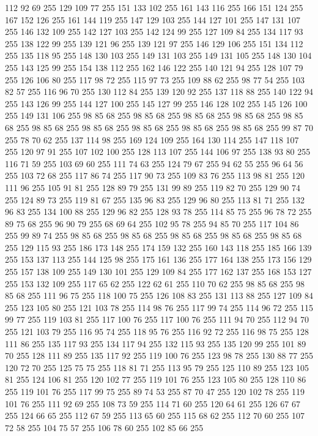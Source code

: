 112 92 69 255 129 109 77 255 151 133 102 255 161 143 116 255 166 151 124 255 167 152 126 255 161 144 119 255 147 129 103 255 144 127 101 255 147 131 107 255 146 132 109 255 142 127 103 255 142 124 99 255 127 109 84 255 134 117 93 255 138 122 99 255 139 121 96 255 139 121 97 255 146 129 106 255 151 134 112 255 135 118 95 255 148 130 103 255 149 131 103 255 149 131 105 255 148 130 104 255 143 125 99 255 154 138 112 255 162 146 122 255 140 121 94 255 128 107 79 255 126 106 80 255 117 98 72 255 115 97 73 255 109 88 62 255 98 77 54 255 103 82 57 255 116 96 70 255 130 112 84 255 139 120 92 255 137 118 88 255 140 122 94 255 143 126 99 255 144 127 100 255 145 127 99 255 146 128 102 255 145 126 100 255 149 131 106 255 98 85 68 255 98 85 68 255 98 85 68 255 98 85 68 255 98 85 68 255 98 85 68 255 98 85 68 255 98 85 68 255 98 85 68 255 98 85 68 255 99 87 70 255 78 70 62 255 137 114 98 255 169 124 109 255 164 130 114 255 147 118 107 255 120 97 91 255
107 102 100 255 128 113 107 255 144 106 97 255 138 93 80 255 116 71 59 255 103 69 60 255 111 74 63 255 124 79 67 255 94 62 55 255 96 64 56 255 103 72 68 255 117 86 74 255 117 90 73 255 109 83 76 255 113 98 81 255 120 111 96 255 105 91 81 255 128 89 79 255 131 99 89 255 119 82 70 255 129 90 74 255 124 89 73 255 119 81 67 255 135 96 83 255 129 96 80 255 113 81 71 255 132 96 83 255 134 100 88 255 129 96 82 255 128 93 78 255 114 85 75 255 96 78 72 255 89 75 68 255 96 90 79 255 68 69 64 255 102 95 78 255 94 85 70 255 117 104 86 255 99 89 74 255 98 85 68 255 98 85 68 255 98 85 68 255 98 85 68 255 98 85 68 255 129 115 93 255 186 173 148 255 174 159 132 255 160 143 118 255 185 166 139 255 153 137 113 255 144 125 98 255 175 161 136 255 177 164 138 255 173 156 129 255 157 138 109 255 149 130 101 255 129 109 84 255 177 162 137 255 168 153 127 255 153 132 109 255 117 65 62 255 122 62 61 255 110 70 62 255 98 85 68 255
98 85 68 255 111 96 75 255 118 100 75 255 126 108 83 255 131 113 88 255 127 109 84 255 123 105 80 255 121 103 78 255 114 98 76 255 117 99 74 255 114 96 72 255 115 99 77 255 119 103 81 255 117 100 76 255 117 100 76 255 111 94 70 255 112 94 70 255 121 103 79 255 116 95 74 255 118 95 76 255 116 92 72 255 116 98 75 255 128 111 86 255 135 117 93 255 134 117 94 255 132 115 93 255 135 120 99 255 101 89 70 255 128 111 89 255 135 117 92 255 119 100 76 255 123 98 78 255 130 88 77 255 120 72 70 255 125 75 75 255 118 81 71 255 113 95 79 255 125 110 89 255 123 105 81 255 124 106 81 255 120 102 77 255 119 101 76 255 123 105 80 255 128 110 86 255 119 101 76 255 117 99 75 255 89 74 53 255 87 70 47 255 120 102 78 255 119 101 76 255 111 92 69 255 108 73 59 255 114 71 60 255 120 64 61 255 126 67 67 255 124 66 65 255 112 67 59 255 113 65 60 255 115 68 62 255 112 70 60 255 107 72 58 255 104 75 57 255 106 78 60 255 102 85 66 255
